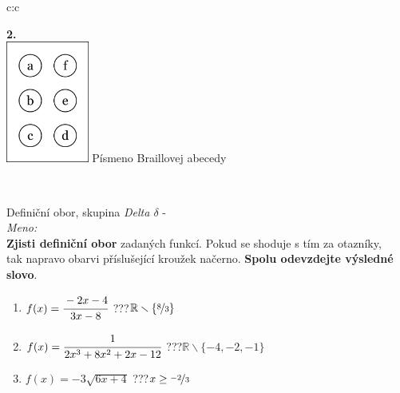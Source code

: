 \documentclass[10pt]{report}
\begin{document}
\begin{tabular}{c:c}
\begin{minipage}[c][99mm][t]{0.49\linewidth}
\begin{center}
\begin{minipage}{0.77\linewidth}
\begin{center}
\begin{varwidth}{\textwidth}
\begin{enumerate}
\end{enumerate}
\end{varwidth}
\end{center}
\end{minipage}
\begin{minipage}{0.20\linewidth}
\begin{center}
{\Huge\bfseries 2.} \\[2mm]
\includegraphics[height=40mm]{../images/braille.png}
{\small Písmeno Braillovej abecedy}
\end{center}
\end{minipage}
\end{center}
\end{minipage}
\\ \hdashline
\begin{minipage}[c][99mm][t]{0.49\linewidth}
\begin{center}
\vspace{7mm}
{\huge Definiční obor, skupina \textit{Delta $\delta$} -}\\[4.5mm]
\textit{Meno:}\phantom{xxxxxxxxxxxxxxxxxxxxxxxxxxxxxxxxxxxxxxxxxxxxxxxxxxxxxxxxxxxxxxxxx}\\[3.5mm]
\textbf{Zjisti definiční obor} zadaných funkcí. Pokud se shoduje s tím za otazníky,\\tak napravo obarvi příslušející kroužek načerno. \textbf{Spolu odevzdejte výsledné slovo}.\\[3mm]
\begin{minipage}{0.77\linewidth}
\begin{center}
\begin{varwidth}{\textwidth}
\begin{enumerate}
\normalsize
\item $f(x)=\cfrac{-2x-4}{3x-8}$\quad \dotfill\; ???\;\dotfill \quad $\mathbb{R}\smallsetminus\{\nicefrac{8}{3}\}$
\item $f(x)=\cfrac{1}{2x^3+8x^2+2x-12}$\quad \dotfill\; ???\;\dotfill \quad $\mathbb{R}\smallsetminus\{-4,-2,-1\}$
\item $f(x)=-3\sqrt{6x+4}$\quad \dotfill\; ???\;\dotfill \quad $x\geq\nicefrac{-2}{3}$

\end{enumerate}
\end{varwidth}
\end{center}
\end{minipage}
\end{center}
\end{minipage}
\end{tabular}
\end{document}
